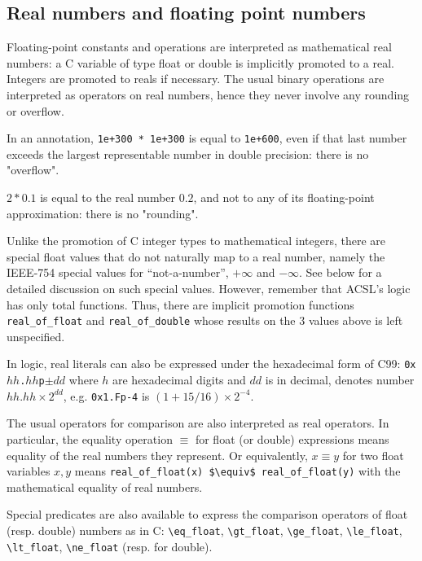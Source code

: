 \subsection{Real numbers and floating point numbers}
\label{sec:floating-point}

Floating-point constants and operations are interpreted as
mathematical real numbers: a C variable of type float or double is
implicitly promoted to a real. Integers are promoted to reals if
necessary. The usual binary operations are interpreted as operators on
real numbers, hence they never involve any rounding or overflow.

\begin{example}
  In an annotation, \lstinline|1e+300 * 1e+300| is equal to
  \lstinline|1e+600|, even if that last number exceeds the largest
  representable number in double precision: there is no "overflow".

  $2 * 0.1$ is equal to the real number $0.2$, and not to any of its
  floating-point approximation: there is no "rounding".
\end{example}
Unlike the promotion of C integer types to mathematical integers,
there are special float values that do not naturally map to a real
number, namely the IEEE-754 special values for ``not-a-number'',
$+\infty$ and $-\infty$. See below for a detailed discussion on such
special values. However, remember that ACSL's logic has only total
functions. Thus, there are implicit promotion functions
\lstinline|real_of_float| and
\lstinline|real_of_double| whose results on
the 3 values above is left unspecified.

In logic, real literals can also be expressed under the hexadecimal
form of C99: \texttt{0x$hh$.$hh$p$\pm{}dd$} where $h$ are hexadecimal
digits and $dd$ is in decimal, denotes number $hh.hh\times
2^{dd}$, e.g. \texttt{0x1.Fp-4} is $(1+15/16)\times 2^{-4}$.


The usual operators for comparison are also interpreted as real operators. 
In particular, the equality operation $\equiv$ for float (or double)
expressions means equality of the real numbers they represent. Or equivalently, $x \equiv y$ for two float
variables $x,y$ means \lstinline|real_of_float(x) $\equiv$ real_of_float(y)|
with the mathematical equality of real
numbers.


Special predicates are also available to express the comparison
operators of float (resp. double) numbers as in C:
\lstinline|\eq_float|,
\lstinline|\gt_float|,
\lstinline|\ge_float|,
\lstinline|\le_float|,
\lstinline|\lt_float|,
\lstinline|\ne_float|
(resp. for double).



